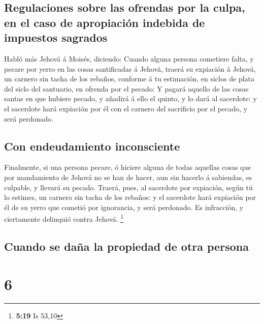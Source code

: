 \hypertarget{regulaciones-sobre-las-ofrendas-por-la-culpa-en-el-caso-de-apropiaciuxf3n-indebida-de-impuestos-sagrados}{%
\subsection{Regulaciones sobre las ofrendas por la culpa, en el caso de
apropiación indebida de impuestos
sagrados}\label{regulaciones-sobre-las-ofrendas-por-la-culpa-en-el-caso-de-apropiaciuxf3n-indebida-de-impuestos-sagrados}}

 Habló más Jehová á Moisés, diciendo: 
Cuando alguna persona cometiere falta, y pecare por yerro en las cosas
santificadas á Jehová, traerá su expiación á Jehová, un carnero sin
tacha de los rebaños, conforme á tu estimación, en siclos de plata del
siclo del santuario, en ofrenda por el pecado:  Y pagará
aquello de las cosas santas en que hubiere pecado, y añadirá á ello el
quinto, y lo dará al sacerdote: y el sacerdote hará expiación por él con
el carnero del sacrificio por el pecado, y será perdonado.

\hypertarget{con-endeudamiento-inconsciente}{%
\subsection{Con endeudamiento
inconsciente}\label{con-endeudamiento-inconsciente}}

 Finalmente, si una persona pecare, ó hiciere alguna de
todas aquellas cosas que por mandamiento de Jehová no se han de hacer,
aun sin hacerlo á sabiendas, es culpable, y llevará su pecado.
 Traerá, pues, al sacerdote por expiación, según tú lo
estimes, un carnero sin tacha de los rebaños: y el sacerdote hará
expiación por él de su yerro que cometió por ignorancia, y será
perdonado.  Es infracción, y ciertamente delinquió contra
Jehová. \footnote{\textbf{5:19} Is 53,10}

\hypertarget{cuando-se-dauxf1a-la-propiedad-de-otra-persona}{%
\subsection{Cuando se daña la propiedad de otra
persona}\label{cuando-se-dauxf1a-la-propiedad-de-otra-persona}}

\hypertarget{section-5}{%
\section{6}\label{section-5}}

